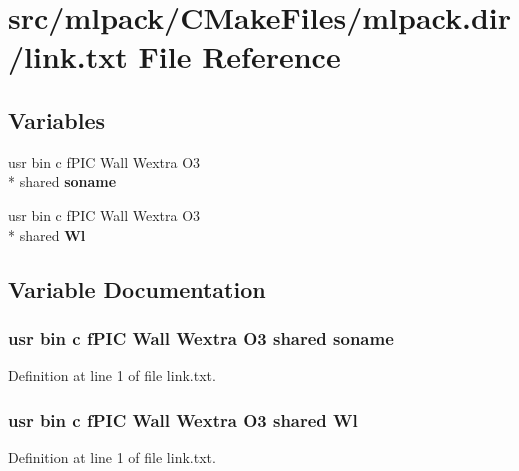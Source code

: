 \section{src/mlpack/\-C\-Make\-Files/mlpack.dir/link.txt File Reference}
\label{CMakeFiles_2mlpack_8dir_2link_8txt}
\subsection*{Variables}
\begin{DoxyCompactItemize}
\item 
usr bin c f\-P\-I\-C Wall Wextra O3 \\*
shared {\bf soname}
\item 
usr bin c f\-P\-I\-C Wall Wextra O3 \\*
shared {\bf Wl}
\end{DoxyCompactItemize}


\subsection{Variable Documentation}
\subsubsection[{soname}]{\setlength{\rightskip}{0pt plus 5cm}usr bin c f\-P\-I\-C Wall Wextra O3 shared soname}\label{CMakeFiles_2mlpack_8dir_2link_8txt_a9d9a111bc7545d78286778a12f934de0}


Definition at line 1 of file link.\-txt.

\subsubsection[{Wl}]{\setlength{\rightskip}{0pt plus 5cm}usr bin c f\-P\-I\-C Wall Wextra O3 shared Wl}\label{CMakeFiles_2mlpack_8dir_2link_8txt_a1d90c9dbbc59fd9c8212f6686590d2fa}


Definition at line 1 of file link.\-txt.

